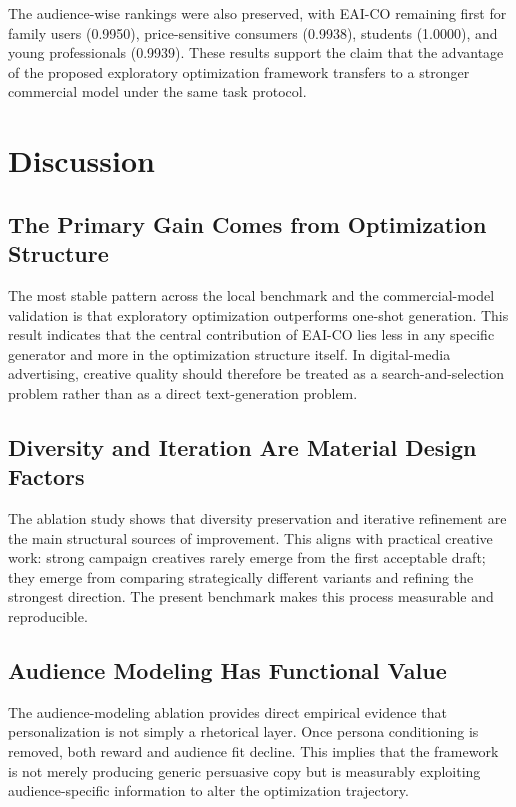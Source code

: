 \documentclass[applsci,article,submit,pdftex,moreauthors]{Definitions/mdpi}
\begin{document}
The audience-wise rankings were also preserved, with EAI-CO remaining first for family users (0.9950), price-sensitive consumers (0.9938), students (1.0000), and young professionals (0.9939). These results support the claim that the advantage of the proposed exploratory optimization framework transfers to a stronger commercial model under the same task protocol.

\section{Discussion}

\subsection{The Primary Gain Comes from Optimization Structure}

The most stable pattern across the local benchmark and the commercial-model validation is that exploratory optimization outperforms one-shot generation. This result indicates that the central contribution of EAI-CO lies less in any specific generator and more in the optimization structure itself. In digital-media advertising, creative quality should therefore be treated as a search-and-selection problem rather than as a direct text-generation problem.

\subsection{Diversity and Iteration Are Material Design Factors}

The ablation study shows that diversity preservation and iterative refinement are the main structural sources of improvement. This aligns with practical creative work: strong campaign creatives rarely emerge from the first acceptable draft; they emerge from comparing strategically different variants and refining the strongest direction. The present benchmark makes this process measurable and reproducible.

\subsection{Audience Modeling Has Functional Value}

The audience-modeling ablation provides direct empirical evidence that personalization is not simply a rhetorical layer. Once persona conditioning is removed, both reward and audience fit decline. This implies that the framework is not merely producing generic persuasive copy but is measurably exploiting audience-specific information to alter the optimization trajectory.
\end{document}

